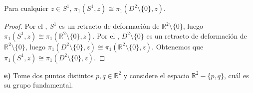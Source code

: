\begin{Lema}\label{Lema:Pi1_circulo_disco_menos_origen}
Para cualquier $z\in S^1$, $\pi_1(S^1,z)\cong\pi_1(D^2\setminus\{0\},z)$.
\end{Lema}
\begin{proof}
Por el , $S^1$ es un retracto de deformación de $\mathbb{R}^2\setminus\{0\}$, luego $\pi_1(S^1,z)\cong\pi_1(\mathbb{R}^2\setminus\{0\},z)$. Por el , $D^2\setminus\{0\}$ es un retracto de deformación de $\mathbb{R}^2\setminus\{0\}$, luego $\pi_1(D^2\setminus\{0\},z)\cong\pi_1(\mathbb{R}^2\setminus\{0\},z)$. Obtenemos que $\pi_1(S^1,z)\cong\pi_1(D^2\setminus\{0\},z)$.
\end{proof}
\textbf{e)} Tome dos puntos distintos $p,q\in\mathbb{R}^2$ y considere el espacio $\mathbb{R}^2-\{p,q\}$, cuál es su grupo fundamental.
